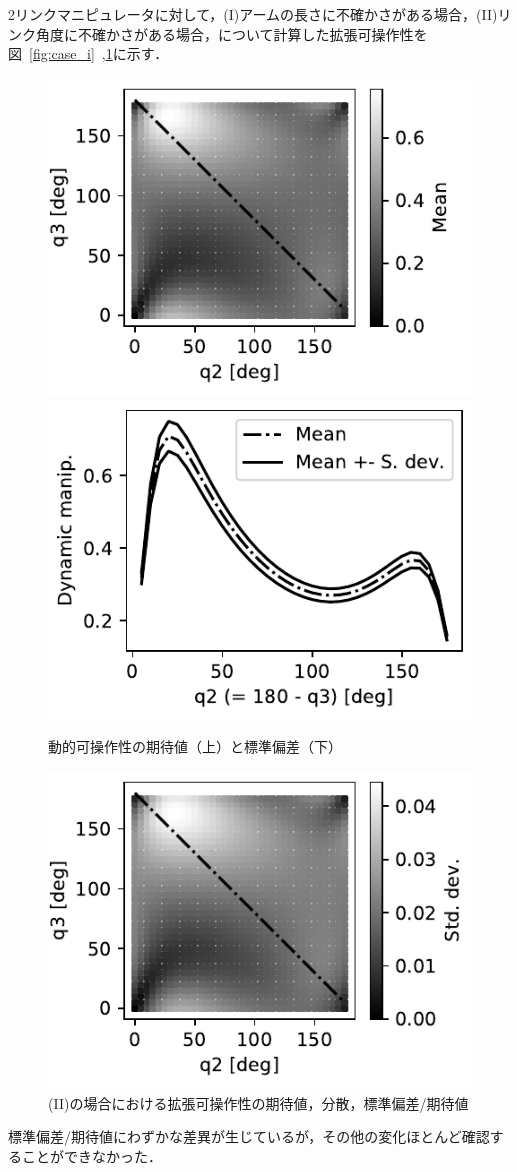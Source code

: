 \documentclass[10pt,a4j,twocolumn]{ltjsarticle}
\begin{document}
2リンクマニピュレータに対して，(I)アームの長さに不確かさがある場合，(II)リンク角度に不確かさがある場合，について計算した拡張可操作性を図~\ref{fig:case_i}~,\ref{fig:case_ii}に示す．
\begin{figure}
  \centering
  \includegraphics[width=80truemm]{./dm_mean.pdf}
  \includegraphics[width=80truemm]{./dm_dist.pdf}
  \caption{動的可操作性の期待値（上）と標準偏差（下）}
  \label{fig:case_i}
  \includegraphics[width=80truemm]{./dm_std.pdf}
  \caption{(II)の場合における拡張可操作性の期待値，分散，標準偏差/期待値}
  \label{fig:case_ii}
\end{figure}
標準偏差/期待値にわずかな差異が生じているが，その他の変化ほとんど確認することができなかった．
\end{document}
